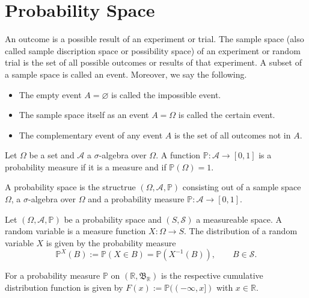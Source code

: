 \section{Probability Space}

\begin{definition}
    An outcome is a possible result of an experiment or trial. The sample space (also called sample discription space or possibility space) of an experiment or random trial is the set of all possible outcomes or results of that experiment. A subset of a sample space is called an event. Moreover, we say the following.
    \begin{itemize}
        \item The empty event \(A = \varnothing\) is called the impossible event.
        \item The sample space itself as an event \(A = \Omega\) is called the certain event.
        \item The complementary event of any event \(A\) is the set of all outcomes not in \(A\).
    \end{itemize}
\end{definition}

\begin{definition}
    Let \(\Omega\) be a set and \(\mathcal{A}\) a \(\sigma\)-algebra over \(\Omega\). A function \(\mathbb{P}: \mathcal{A} \rightarrow [0, 1]\) is a probability measure if it is a measure and if \(\mathbb{P}(\Omega) = 1\).
\end{definition}

\begin{definition}
    A probability space is the structrue \((\Omega, \mathcal{A}, \mathbb{P})\) consisting out of a sample space \(\Omega\), a \(\sigma\)-algebra over \(\Omega\) and a probability measure \(\mathbb{P}: \mathcal{A} \rightarrow [0, 1]\).
\end{definition}

\begin{definition}
    Let \((\Omega, \mathcal{A}, \mathbb{P})\) be a probability space and \((S, \mathcal{S})\) a measureable space. A random variable is a measure function \(X: \Omega \rightarrow S\). The distribution of a random variable \(X\) is given by the probability measure
    \begin{equation}
        \mathbb{P}^X (B) := \mathbb{P}(X \in B) = \mathbb{P}(X^{-1} (B)), \qquad B \in \mathcal{S} \text{.}
    \end{equation}
\end{definition}

\begin{definition}
    For a probability measure \(\mathbb{P}\) on \((\mathbb{R}, \mathfrak{B}_\mathbb{R})\) is the respective cumulative distribution function is given by \(F(x) := \mathbb{P}((-\infty, x])\) with \(x \in \mathbb{R}\).
\end{definition}